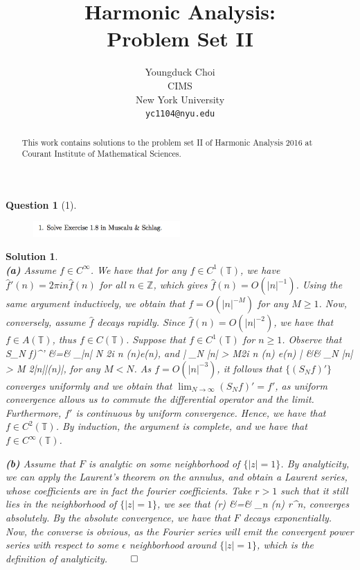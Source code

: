 \documentclass{article} %
\title{Harmonic Analysis:  \\
Problem Set II}
\author{
Youngduck Choi \\
CIMS \\
New York University\\
\texttt{yc1104@nyu.edu} \\
}
\def\eQb#1\eQe{\begin{eqnarray*}#1\end{eqnarray*}}
\theoremstyle{quest}
\newtheorem*{question}{Question}
\newtheorem*{solution}{Solution}
\begin{document}
\maketitle

\begin{abstract}
This work contains solutions to the problem set II
of Harmonic Analysis 2016 at Courant Institute of Mathematical Sciences.
\end{abstract}

\begin{question}[1]
\hfill
\begin{figure}[h!]
  \centering
    \includegraphics[width=0.5\textwidth]{HA-2-1.png}
\end{figure}
\end{question}
\begin{solution} \hfill \\
\textbf{(a)} Assume $ f \in C^{\infty}$. We have that for any $f \in C^{1}(\mathbb{T})$, we have
$\hat{f}'(n) = 2\pi i n \hat{f}(n)$ for all $n \in \mathbb{Z}$, which gives $\hat{f}(n) 
= O(|n|^{-1})$.
Using the same argument inductively, we obtain that $f = O(|n|^{-M})$ for any $M \geq 1$.
Now, conversely, assume $\hat{f}$ decays rapidly.
Since $\hat{f}(n) = O(|n|^{-2})$, we have
that $f \in A(\mathbb{T})$, thus $f \in C(\mathbb{T})$. Suppose that $f \in C^{1}(\mathbb{T})$
for $n \geq 1$. Observe that 
\eQb
(S_N f)^{'} &=& \sum_{|n| \leq N} 2\pi i n (n)e(n),
\eQe  
and
\eQb
\left| \sum_{N \geq |n| > M}2\pi i n (n) e(n) \right| &\leq& 
\sum_{N \geq |n| > M} 2\pi|n||(n)|,
\eQe
for any $M < N$.
As $f = O(|n|^{-3})$, it follows that $\{ (S_N f)' \}$ converges uniformly and we obtain that
$\lim_{N \to \infty} (S_N f)' = f'$, as uniform convergence allows us to commute
the differential operator and the limit. Furthermore, $f'$ is continuous by uniform convergence.
Hence, we have that $f \in C^{2}(\mathbb{T})$.  
By induction, the argument is complete, and we have that $f \in C^{\infty}(\mathbb{T})$.

\bigskip

\textbf{(b)} Assume that $F$ is analytic on some neighborhood of $\{ |z| = 1\}$.
By analyticity, we can apply the Laurent's theorem on the annulus,
and obtain a Laurent series, whose coefficients are in fact the fourier coefficients. Take 
$r > 1$ such that it still lies in the neighborhood of $\{|z| = 1\}$, we see that
\eQb
F(r) &=& \sum_{n \in {}} (n) r^{n},
\eQe
converges absolutely. By the absolute convergence, we have that $F$ decays
exponentially. Now, the converse is obvious, as the Fourier series will emit the
convergent power series with respect to some $\epsilon$ neighborhood around $\{ |z| = 1\}$,
which is the definition of analyticity. \hfill $\qed$
\end{solution}
\end{document}
